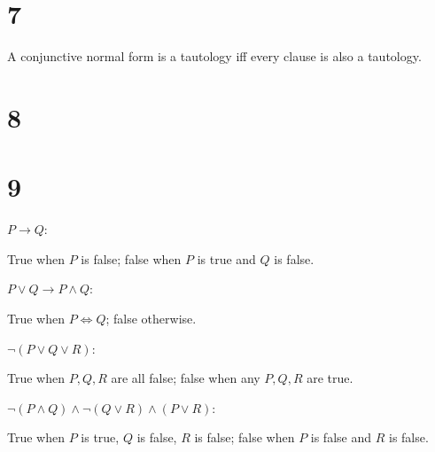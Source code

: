 \documentclass[10pt]{article}
\begin{document}
\section*{7}
A conjunctive normal form is a tautology iff every clause is also a tautology.


\section*{8}


\section*{9}
\begin{description*}
  \item[$P\to Q$:] 

  True when $P$ is false; false when $P$ is true and $Q$ is false.

  \item[$P \lor Q \to P \land Q$:]

  True when $P\iff Q$; false otherwise.

  \item[$\lnot (P \lor Q \lor R)$:]

  True when $P,Q,R$ are all false; false when any $P,Q,R$ are true.

  \item[$\lnot (P \land Q) \land \lnot (Q \lor R) \land (P\lor R)$:]

  True when $P$ is true, $Q$ is false, $R$ is false; false when $P$ is false and $R$ is false.


\end{description*}
\end{document}
